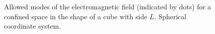 \begin{figure}
\centering

\caption{Allowed modes of the electromagnetic field (indicated by dots) for a confined space in the shape of a cube with side $L$. Spherical coordinate system.}
\label{figCh1_pic4}
\end{figure}